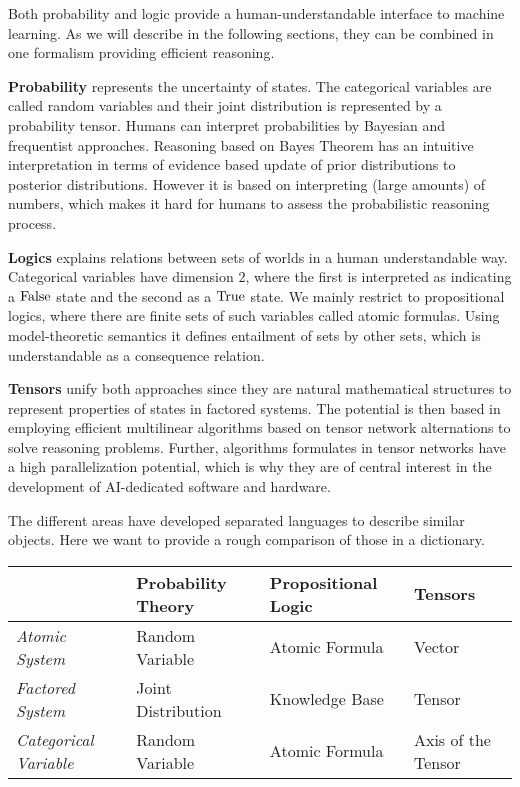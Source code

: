 Both probability and logic provide a human-understandable interface to machine learning.
As we will describe in the following sections, they can be combined in one formalism providing efficient reasoning.


\textbf{Probability} represents the uncertainty of states.
The categorical variables are called random variables and their joint distribution is represented by a probability tensor.
Humans can interpret probabilities by Bayesian and frequentist approaches.
Reasoning based on Bayes Theorem has an intuitive interpretation in terms of evidence based update of prior distributions to posterior distributions.
However it is based on interpreting (large amounts) of numbers, which makes it hard for humans to assess the probabilistic reasoning process.

\textbf{Logics} explains relations between sets of worlds in a human understandable way.
Categorical variables have dimension $2$, where the first is interpreted as indicating a $\mathrm{False}$ state and the second as a $\mathrm{True}$ state.
We mainly restrict to propositional logics, where there are finite sets of such variables called atomic formulas.
Using model-theoretic semantics it defines entailment of sets by other sets, which is understandable as a consequence relation.

\textbf{Tensors} unify both approaches since they are natural mathematical structures to represent properties of states in factored systems.
The potential is then based in employing efficient multilinear algorithms based on tensor network alternations to solve reasoning problems.
Further, algorithms formulates in tensor networks have a high parallelization potential, which is why they are of central interest in the development of AI-dedicated software and hardware.


The different areas have developed separated languages to describe similar objects.
Here we want to provide a rough comparison of those in a dictionary.

\begin{tabular}{l|l|l|l}
    & \textbf{Probability Theory} & \textbf{Propositional Logic} & \textbf{Tensors}   \\
    \hline
    \textit{Atomic System}        & Random Variable             & Atomic Formula               & Vector             \\
    \textit{Factored System}      & Joint Distribution          & Knowledge Base               & Tensor             \\
    \textit{Categorical Variable} & Random Variable             & Atomic Formula               & Axis of the Tensor
\end{tabular}

